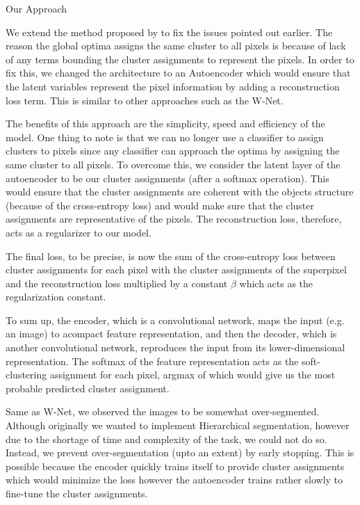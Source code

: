 \documentclass{article}
\begin{document}
\begin{ssection}{Our Approach}

	We extend the method proposed by \cite{backprop} to fix the issues pointed out earlier. The reason the global optima assigns the same cluster to all pixels is because of lack of any terms bounding the cluster assignments to represent the pixels. In order to fix this, we changed the architecture to an Autoencoder which would ensure that the latent variables represent the pixel information by adding a reconstruction loss term. This is similar to other approaches such as the W-Net.

	The benefits of this approach are the simplicity, speed and efficiency of the model. One thing to note is that we can no longer use a classifier to assign clusters to pixels since any classifier can approach the optima by assigning the same cluster to all pixels. To overcome this, we consider the latent layer of the autoencoder to be our cluster assignments (after a softmax operation). This would ensure that the cluster assignments are coherent with the objects structure (because of the cross-entropy loss) and would make sure that the cluster assignments are representative of the pixels. The reconstruction loss, therefore, acts as a regularizer to our model.

	The final loss, to be precise, is now the sum of the cross-entropy loss between cluster assignments for each pixel with the cluster assignments of the superpixel and the reconstruction loss multiplied by a constant $\beta$ which acts as the regularization constant.

	To sum up, the encoder, which is a convolutional network, maps the input (e.g. an image) to acompact feature representation, and then the decoder, which is another convolutional network, reproduces the input from its lower-dimensional representation. The softmax of the feature representation acts as the soft-clustering assignment for each pixel, argmax of which would give us the most probable predicted cluster assignment.

	Same as W-Net, we observed the images to be somewhat over-segmented. Although originally we wanted to implement Hierarchical segmentation, however due to the shortage of time and complexity of the task, we could not do so. Instead, we prevent over-segmentation (upto an extent) by early stopping. This is possible because the encoder quickly trains itself to provide cluster assignments which would minimize the loss however the autoencoder trains rather slowly to fine-tune the cluster assignments.


\end{ssection}
\end{document}
